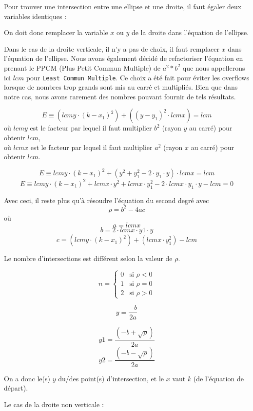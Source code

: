 \documentclass[]{report}
\begin{document}
Pour trouver une intersection entre une ellipse
et une droite, il faut égaler deux variables 
identiques :

On doit donc remplacer la variable $x$ ou $y$ de la droite dans
l'équation de l'ellipse.

Dans le cas de la droite verticale, il n'y a pas de choix, il faut remplacer
$x$ dans l'équation de l'ellipse.
Nous avons également décidé de refactoriser l'équation en 
prenant le PPCM (Plus Petit Commun Multiple) de $a^2 * b^2$ que
nous appellerons ici $lcm$ pour \texttt{Least Commun Multiple}. 
Ce choix a été fait pour éviter les overflows lorsque 
de nombres trop grands sont mis au carré et multipliés.
Bien que dans notre cas, nous avons rarement des nombres
pouvant fournir de tels résultats.

$$ E \equiv (lcmy \cdot (k - x_1)^2) + ((y - y_1)^2 \cdot lcmx) = lcm $$  
où $lcmy$ est le facteur par lequel il faut multiplier
$b^2$ (rayon $y$ au carré) pour obtenir $lcm$, \\
où $lcmx$ est le facteur par lequel il faut multiplier
$a^2$ (rayon $x$ au carré) pour obtenir $lcm$.

$$ E \equiv lcmy \cdot (k - x_1)^2 + (y^2 + y_1^2 - 2 \cdot y_1 \cdot y)
\cdot lcmx = lcm$$
$$ E \equiv lcmy \cdot (k - x_1)^2 + lcmx \cdot y^2 + lcmx \cdot
y_1^2 - 2 \cdot lcmx \cdot y_1 \cdot y - lcm = 0 $$

Avec ceci, il reste plus qu'à résoudre l'équation du second degré 
avec 
$$ \rho = b^2 - 4ac$$
où $$ a = lcmx $$
$$ b = 2 \cdot lcmx \cdot y1 \cdot y $$
$$ c = (lcmy \cdot (k-x_1)^2) + (lcmx \cdot y_1^2) - lcm $$



Le nombre d'intersections est différent selon la valeur de $\rho$.

\[
	n =
	\begin{cases}
		0 & \text{si } \rho < 0 \\
		1 & \text{si } \rho = 0 \\
		2 & \text{si } \rho > 0  
	\end{cases}
\]

$$ y = \frac {-b}{2a} $$

$$ y1 = \frac{(-b + \sqrt{\rho})}{2a} $$
$$ y2 = \frac{(-b - \sqrt{\rho})}{2a} $$

On a donc le(s) $y$ du/des point(s) d'intersection, et le $x$
vaut $k$ (de l'équation de départ).



Le cas de la droite non verticale : 
\end{document}
